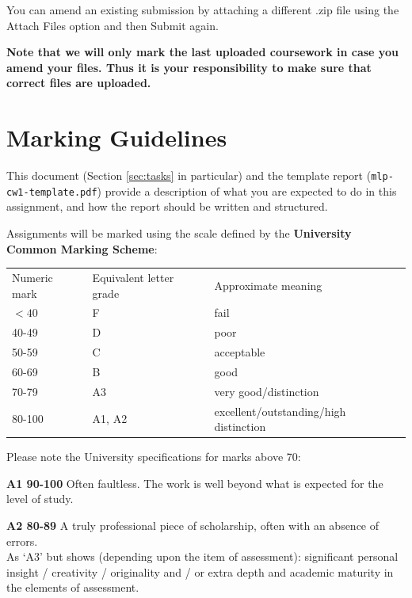 \documentclass[11pt,]{article}
\begin{document}
You can amend an existing submission by attaching a different .zip file using the Attach Files option and then Submit again.

\textbf{Note that we will only mark the last uploaded coursework in case you amend your files. Thus it is your responsibility to make sure that correct files are uploaded.}

\newpage
\section{Marking Guidelines}
\label{sec:marking-scheme}
This document (Section \ref{sec:tasks} in particular) and the template report (\verb+mlp-cw1-template.pdf+) provide a description of what you are expected to do in this assignment, and how the report should be written and structured.

Assignments will be marked using the scale defined by the \textbf{University Common Marking Scheme}:
\begin{center}
\begin{tabular}{lll}
Numeric mark & Equivalent letter grade & Approximate meaning \\
$< 40$ & F & fail \\
40-49 & D & poor \\
50-59 & C & acceptable \\
60-69 & B & good \\
70-79 & A3 & very good/distinction \\
80-100 & A1, A2 & excellent/outstanding/high distinction
\end{tabular}
\end{center}

Please note the University specifications for marks above 70:

{\bf A1 90-100}
Often faultless. The work is well beyond what is expected for the level of study.

{\bf A2 80-89}
A truly professional piece of scholarship, often with an absence of errors. \\
As `A3' but shows (depending upon the item of assessment):
significant personal insight / creativity / originality
and / or
extra depth and academic maturity in the elements of assessment.
\end{document}
